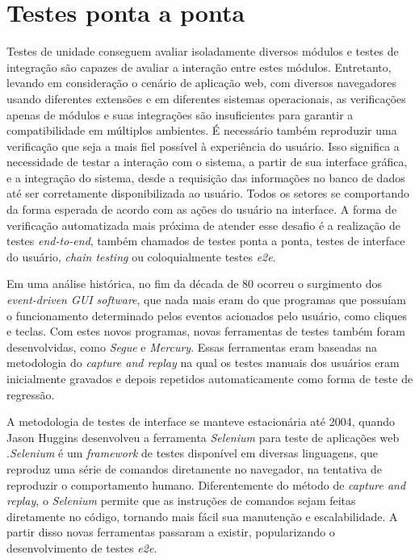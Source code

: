\hypertarget{testes-ponta-a-ponta}{%
\section{\texorpdfstring{Testes ponta a ponta}{Testes ponta a ponta}}\label{testes-ponta-a-ponta}}

Testes de unidade conseguem avaliar isoladamente diversos módulos e testes de integração são capazes de avaliar a interação entre estes módulos. Entretanto, levando em consideração o cenário de aplicação web, com diversos navegadores usando diferentes extensões e em diferentes sistemas operacionais, as verificações apenas de módulos e suas integrações são insuficientes para garantir a compatibilidade em múltiplos ambientes. É necessário também reproduzir uma verificação que seja a mais fiel possível à experiência do usuário. Isso significa a necessidade de testar a interação com o sistema, a partir de sua interface gráfica, e a integração do sistema, desde a requisição das informações no banco de dados até ser corretamente disponibilizada ao usuário. Todos os setores se comportando da forma esperada de acordo com as ações do usuário na interface. A forma de verificação automatizada mais próxima de atender esse desafio é a realização de testes \emph{end-to-end}, também chamados de testes ponta a ponta, testes de interface do usuário, \emph{chain testing} ou coloquialmente testes \emph{e2e}.

Em uma análise histórica, no fim da década de 80 ocorreu o surgimento dos \emph{event-driven GUI software}, que nada mais eram do que programas que possuíam o funcionamento determinado pelos eventos acionados pelo usuário, como cliques e teclas. Com estes novos programas, novas ferramentas de testes também foram desenvolvidas, como \emph{Segue} e \emph{Mercury}. Essas ferramentas eram baseadas na metodologia do \emph{capture and replay} na qual os testes manuais dos usuários eram inicialmente gravados e depois repetidos automaticamente como forma de teste de regressão.

A metodologia de testes de interface se manteve estacionária até 2004, quando Jason Huggins desenvolveu a ferramenta \emph{Selenium} para teste de aplicações web \cite{brown}.\emph{Selenium} é um \emph{framework} de testes disponível em diversas linguagens, que reproduz uma série de comandos diretamente no navegador, na tentativa de reproduzir o comportamento humano. Diferentemente do método de \emph{capture and replay}, o \emph{Selenium} permite que as instruções de comandos sejam feitas diretamente no código, tornando mais fácil sua manutenção e escalabilidade. A partir disso novas ferramentas passaram a existir, popularizando o desenvolvimento de testes \emph{e2e}.

